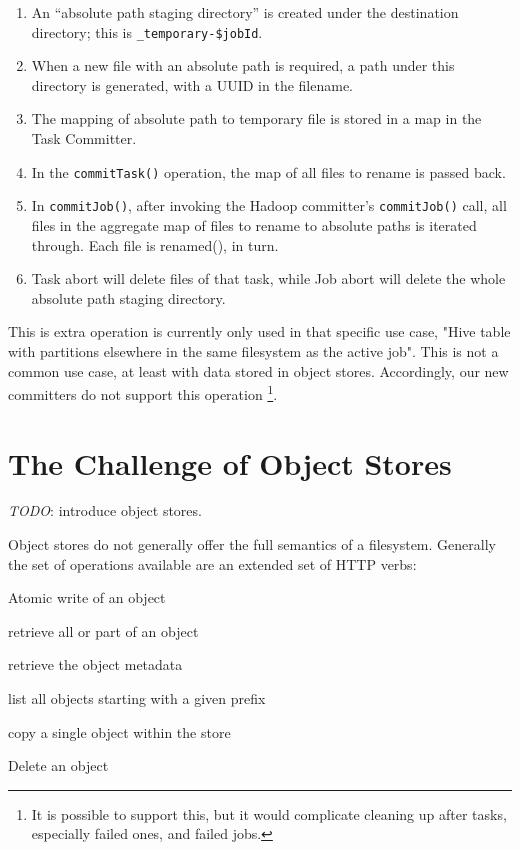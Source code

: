 \documentclass[conference]{IEEEtran}
\newcommand{\TODO}{\emph{TODO}}
\begin{document}
\begin{enumerate}
  \item An ``absolute path staging directory'' is created under the destination
  directory;
  this is \texttt{\_temporary-\$jobId}.
  \item When a new file with an absolute path is required, a path under this
  directory is generated, with a UUID in the filename.
  \item The mapping of absolute path to temporary file is stored in a map in the Task Committer.
  \item In the \texttt{commitTask()} operation, the map of all files to rename is passed back.
  \item In \texttt{commitJob()}, after invoking the Hadoop committer's \texttt{commitJob()}
  call, all files in the aggregate map of files to rename to absolute paths is iterated through.
  Each file is renamed(), in turn.
  \item Task abort will delete files of that task, while Job abort will delete
  the whole absolute path staging directory.
\end{enumerate}

This is extra operation is currently only used in that specific use case,
"Hive table with partitions elsewhere in the same filesystem as the active job".
This is not a common use case, at least with data stored in object stores.
Accordingly, our new committers do not support this operation
\footnote{It is possible to support this, but it would complicate cleaning up
after tasks, especially failed ones, and failed jobs.}.



\section{The Challenge of Object Stores}
\label{sec:object-stores}


\TODO: introduce object stores.



Object stores do not generally offer the full semantics of a filesystem.
Generally the set of operations available are an extended set of HTTP verbs:

\begin{description}[leftmargin=8em,style=nextline]
  \item[PUT] Atomic write of an object
  \item[GET] retrieve all or part of an object
  \item[HEAD] retrieve the object metadata
  \item[LIST] list all objects starting with a given prefix
  \item[COPY] copy a single object within the store
  \item[DELETE] Delete an object
\end{description}
\end{document}
